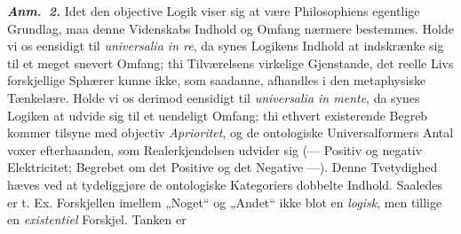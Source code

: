 \documentclass[12pt]{book}
\newcommand{\anm}[1]{\emph{\textbf{Anm.~#1.}}}
\newcommand{\opage}[1]{\marginnote{\footnotesize\textit{[#1]}}}
\begin{document}
\anm{2} Idet den objective Logik viser sig at være Philosophiens egentlige Grundlag, maa denne
Videnskabs Indhold og Omfang nærmere bestemmes. Holde vi os eensidigt til \textit{universalia
in re}, da synes Logikens Indhold at indskrænke sig til et meget snevert Omfang; thi
Tilværelsens virkelige Gjenstande, det reelle Livs forskjellige Sphærer kunne ikke, som
saadanne, afhandles i den metaphysiske Tænkelære. Holde vi os derimod eensidigt til
\textit{universalia in mente}, da
\opage{100} %
synes Logiken at udvide sig til et uendeligt Omfang; thi ethvert existerende Begreb kommer
tilsyne med objectiv \emph{Aprioritet}, og de ontologiske Universalformers Antal voxer
efterhaanden, som Realerkjendelsen udvider sig (--- Positiv og negativ Elektricitet; Begrebet
om det Positive og det Negative ---). Denne Tvetydighed hæves ved at tydeliggjøre de
ontologiske Kategoriers dobbelte Indhold. Saaledes er t. Ex. Forskjellen imellem „Noget“ og
„Andet“ ikke blot en \emph{logisk}, men tillige en \emph{existentiel} Forskjel. Tanken er
\end{document}
